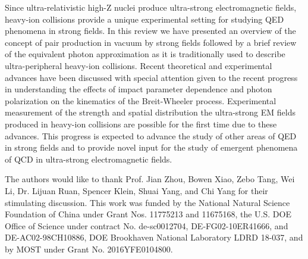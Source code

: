\documentclass[twocolumn,epjc3]{svjour3}\sloppy
\begin{document}
Since ultra-relativistic high-Z nuclei produce ultra-strong electromagnetic fields, heavy-ion collisions provide a unique experimental setting for studying QED phenomena in strong fields. In this review we have presented an overview of the concept of pair production in vacuum by strong fields followed by a brief review of the equivalent photon approximation as it is traditionally used to describe ultra-peripheral heavy-ion collisions. Recent theoretical and experimental advances have been discussed with special attention given to the recent progress in understanding the effects of impact parameter dependence and photon polarization on the kinematics of the Breit-Wheeler process. Experimental measurement of the strength and spatial distribution the ultra-strong EM fields produced in heavy-ion collisions are possible for the first time due to these advances. This progress is expected to advance the study of other areas of QED in strong fields and to provide novel input for the study of emergent phenomena of QCD in ultra-strong electromagnetic fields.  



\begin{acknowledgements}
The authors would like to thank Prof. Jian Zhou, Bowen Xiao, Zebo Tang, Wei Li, Dr. Lijuan Ruan, Spencer Klein, Shuai Yang, and Chi Yang for their stimulating discussion. 
This work was funded by the National Natural Science Foundation of China
under Grant Nos. 11775213 and 11675168, 
the U.S. DOE Office of Science under contract No. de-sc0012704, DE-FG02-10ER41666, and DE-AC02-98CH10886, 
DOE Brookhaven National Laboratory LDRD 18-037, and by MOST under Grant No. 2016YFE0104800.
\end{acknowledgements}



\end{document}
